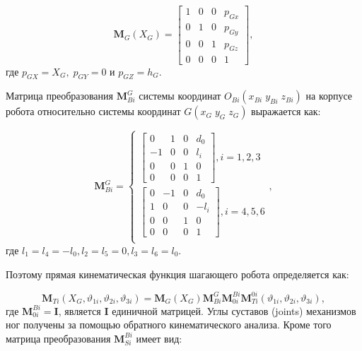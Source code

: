 \begin{equation}
	\mathbf{M}_G(X_G) =
	\begin{bmatrix}
		1 & 0 & 0 & p_{Gx}\\
		0 & 1 & 0 & p_{Gy}\\
		0 & 0 & 1 & p_{Gz}\\
		0 &	0 &	0 &	1
	\end{bmatrix}
	,  
\end{equation}
где $p_{GX}=X_G, \; p_{GY}=0$ и $p_{GZ} = h_G$.

Матрица преобразования $\mathbf{M}^G_{Bi}$ системы координат $O_{Bi}(x_{Bi}\;y_{Bi}\;z_{Bi})$ на корпусе робота относительно системы координат $G(x_G\;y_G\;z_G)$ выражается как:

\begin{equation}
	\mathbf{M}^G_{Bi} = 
	\begin{cases}
		\begin{bmatrix}
			0 	& 1	& 0 & 	d_0	\\
			-1 	& 0 & 0 & 	l_i	\\
			0 	& 0 & 1 & 	0	\\
			0 	& 0 & 0 &	1
		\end{bmatrix}
		,i = 1,2,3\\
				\begin{bmatrix}
			0 	& -1 	& 0 & 	d_0	\\
			1 	& 0     & 0 & 	-l_i	\\
			0 	& 0 		& 1 & 	0	\\
			0 	& 0 		& 0 &	1
		\end{bmatrix}
		,i = 4,5,6\\
	\end{cases}
	,
\end{equation}
где $l_1 = l_4 = -l_0, l_2 = l_5=0, l_3=l_6=l_0$.

Поэтому прямая кинематическая функция шагающего робота определяется как:

\begin{equation}
\mathbf{M}_{T i}\left(X_{G}, \vartheta_{1 i}, \vartheta_{2 i}, \vartheta_{3 i}\right)=\mathbf{M}_{G}\left(X_{G}\right) \mathbf{M}_{B i}^{G} \mathbf{M}_{0 i}^{B i} \mathbf{M}_{T i}^{0 i}\left(\vartheta_{1 i}, \vartheta_{2 i}, \vartheta_{3 i}\right)
,
\end{equation}
где $\mathbf{M}^{Bi}_{0i} = \mathbf{I}$, является $\mathbf{I}$ единичной матрицей. Углы суставов (joints) механизмов ног получены за помощью обратного кинематического анализа. Кроме того матрица преобразования $\mathbf{M}^{Bi}_{Si}$ имеет вид:

